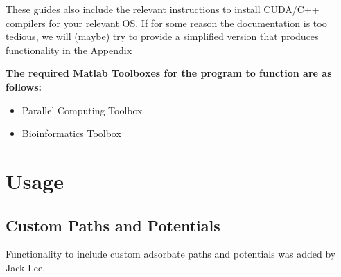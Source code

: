 \documentclass[11pt,letterpaper]{article}
\begin{document}
These guides also include the relevant instructions to install CUDA/C++ compilers for your relevant OS. If for some reason the documentation is too tedious, we will (maybe) try to provide a simplified version that produces functionality in the \hyperref[sec:compilerinstall]{Appendix}\\




\bigskip

\textbf{The required Matlab Toolboxes for the program to function are as follows:}
\begin{itemize}
    \item Parallel Computing Toolbox
    \item Bioinformatics Toolbox
\end{itemize}

\section{Usage}
\subsection{Custom Paths and Potentials}
Functionality to include custom adsorbate paths and potentials was added by Jack Lee.
\end{document}
